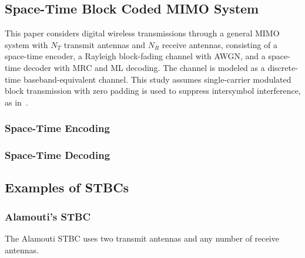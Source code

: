 \message{ !name(report.tex)}\documentclass[12pt,onecolumn]{IEEEtran}
\begin{document}
\subsection{Space-Time Block Coded MIMO System}
This paper considers digital wireless transmissions through a general MIMO system with $N_T$ transmit antennas and $N_R$ receive antennas, consisting of a space-time encoder, a Rayleigh block-fading channel with AWGN, and a space-time decoder with MRC and ML decoding. The channel is modeled as a discrete-time baseband-equivalent channel. This study assumes single-carrier modulated block transmission with zero padding is used to suppress intersymbol interference, as in~\cite{wang00,wang04}.

\subsubsection{Space-Time Encoding}

\subsubsection{Space-Time Decoding}

\subsection{Examples of STBCs}

\subsubsection{Alamouti's STBC}
The Alamouti STBC uses two transmit antennas and any number of receive antennas.


\end{document}
